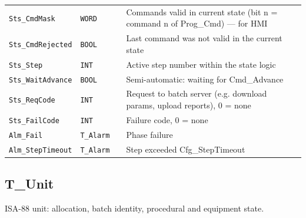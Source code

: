 \begin{small}
\begin{longtable}{@{}P{3.70cm}P{2.20cm}P{1.70cm}P{8.91cm}@{}}
\texttt{Sts\_CmdMask} & \texttt{WORD} &  & Commands valid in current state (bit n = command n of Prog\_Cmd) --- for HMI \\
\texttt{Sts\_CmdRejected} & \texttt{BOOL} &  & Last command was not valid in the current state \\
\texttt{Sts\_Step} & \texttt{INT} &  & Active step number within the state logic \\
\texttt{Sts\_WaitAdvance} & \texttt{BOOL} &  & Semi-automatic: waiting for Cmd\_Advance \\
\texttt{Sts\_ReqCode} & \texttt{INT} &  & Request to batch server (e.g. download params, upload reports), 0 = none \\
\texttt{Sts\_FailCode} & \texttt{INT} &  & Failure code, 0 = none \\
\texttt{Alm\_Fail} & \texttt{T\_Alarm} &  & Phase failure \\
\texttt{Alm\_StepTimeout} & \texttt{T\_Alarm} &  & Step exceeded Cfg\_StepTimeout \\
\bottomrule
\end{longtable}
\end{small}

\subsection{T\_Unit}\label{sec:pclib-t-unit}

ISA-88 unit: allocation, batch identity, procedural and equipment state.

\par{}\par

